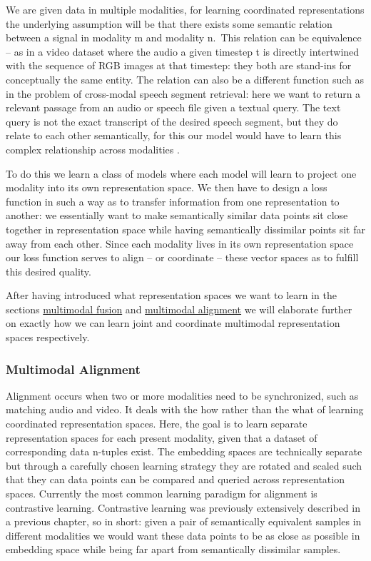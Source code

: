 \documentclass[
]{krantz}
\begin{document}
We are given data in multiple modalities, for learning coordinated representations the underlying assumption will be that there exists some semantic relation between a signal in modality m and modality n.~This relation can be equivalence -- as in a video dataset where the audio a given timestep t is directly intertwined with the sequence of RGB images at that timestep: they both are stand-ins for conceptually the same entity. The relation can also be a different function such as in the problem of cross-modal speech segment retrieval: here we want to return a relevant passage from an audio or speech file given a textual query. The text query is not the exact transcript of the desired speech segment, but they do relate to each other semantically, for this our model would have to learn this complex relationship across modalities \citep{baltrušaitis2017multimodal}.

To do this we learn a class of models where each model will learn to project one modality into its own representation space. We then have to design a loss function in such a way as to transfer information from one representation to another: we essentially want to make semantically similar data points sit close together in representation space while having semantically dissimilar points sit far away from each other. Since each modality lives in its own representation space our loss function serves to align -- or coordinate -- these vector spaces as to fulfill this desired quality.

After having introduced what representation spaces we want to learn in the sections \protect\hyperlink{multimodal-fusion}{multimodal fusion} and \protect\hyperlink{multimodal-alignment}{multimodal alignment} we will elaborate further on exactly how we can learn joint and coordinate multimodal representation spaces respectively.

\hypertarget{multimodal-alignment}{%
\subsubsection{Multimodal Alignment}\label{multimodal-alignment}}

Alignment occurs when two or more modalities need to be synchronized, such as matching audio and video. It deals with the how rather than the what of learning coordinated representation spaces. Here, the goal is to learn separate representation spaces for each present modality, given that a dataset of corresponding data n-tuples exist. The embedding spaces are technically separate but through a carefully chosen learning strategy they are rotated and scaled such that they can data points can be compared and queried across representation spaces. Currently the most common learning paradigm for alignment is contrastive learning. Contrastive learning was previously extensively described in a previous chapter, so in short: given a pair of semantically equivalent samples in different modalities we would want these data points to be as close as possible in embedding space while being far apart from semantically dissimilar samples\citep{baltrušaitis2017multimodal}.
\end{document}
